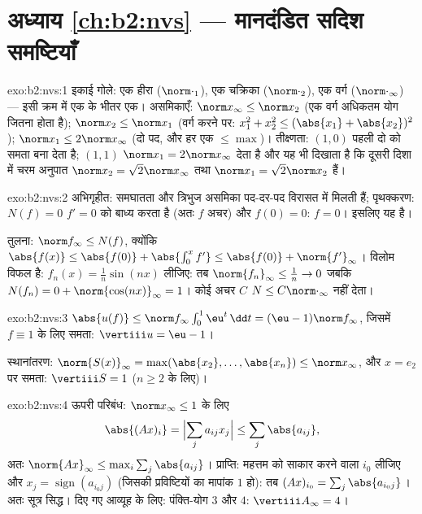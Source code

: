 \section*{अध्याय \ref{ch:b2:nvs} --- मानदंडित सदिश समष्टियाँ}

\begin{solution}{exo:b2:nvs:1}
इकाई गोले: एक हीरा ($\norm\cdot_1$), एक चक्रिका ($\norm\cdot_2$), एक वर्ग ($\norm\cdot_\infty$) --- इसी क्रम
में एक के भीतर एक। असमिकाएँ: $\norm x_\infty \leq \norm x_2$ (एक वर्ग अधिकतम योग जितना होता है);
$\norm x_2 \leq \norm x_1$ (वर्ग करने पर: $x_1^2 + x_2^2 \leq (\abs{x_1}
+ \abs{x_2})^2$); $\norm x_1 \leq 2\norm x_\infty$ (दो पद, और हर एक $\leq \max$)। तीक्ष्णता: $(1, 0)$
पहली दो को समता बना देता है; $(1, 1)$ $\norm x_1 = 2\norm x_\infty$ देता है और यह भी दिखाता है कि
दूसरी दिशा में चरम अनुपात $\norm x_2 = \sqrt2 \norm x_\infty$ तथा $\norm x_1 = \sqrt2 \norm
x_2$ हैं।
\end{solution}

\begin{solution}{exo:b2:nvs:2}
 अभिगृहीत: समघातता और त्रिभुज असमिका पद-दर-पद विरासत में मिलती
हैं; पृथक्करण: $N(f) = 0$ $f' = 0$ को बाध्य करता है (अतः $f$ अचर) और $f(0) = 0$: $f = 0$।
इसलिए यह  है।

तुलना: $\norm f_\infty \leq N(f)$, क्योंकि $\abs{f(x)} \leq
\abs{f(0)} + \abs{\int_0^x f'} \leq \abs{f(0)} +
\norm{f'}_\infty$। विलोम विफल है: $f_n(x) = \frac1n
\sin(nx)$ लीजिए: तब $\norm{f_n}_\infty \leq \frac1n \to 0$ जबकि $N(f_n) = 0 + \norm{\cos(nx)}_\infty = 1$।
कोई अचर $C$ $N \leq C\norm\cdot_\infty$ नहीं देता।
\end{solution}

\begin{solution}{exo:b2:nvs:3}
$\abs{u(f)} \leq \norm f_\infty \int_0^1 \eu^t\,\dd t = (\eu -
1)\norm f_\infty$, जिसमें $f \equiv 1$ के लिए समता: $\vertiii u =
\eu - 1$।

स्थानांतरण: $\norm{S(x)}_\infty = \max(\abs{x_2}, \dots, \abs{x_n}) \leq
\norm x_\infty$, और $x = e_2$ पर समता: $\vertiii S = 1$ ($n
\geq 2$ के लिए)।
\end{solution}

\begin{solution}{exo:b2:nvs:4}
ऊपरी परिबंध: $\norm x_\infty \leq 1$ के लिए
\[
\abs{(Ax)_i} = \Bigl|\sum_j a_{ij}x_j\Bigr| \leq \sum_j
\abs{a_{ij}},
\]
अतः $\norm{Ax}_\infty \leq \max_i \sum_j \abs{a_{ij}}$। प्राप्ति: महत्तम को साकार करने वाला $i_0$ लीजिए और $x_j = \operatorname{sign}(a_{i_0
j})$ (जिसकी
प्रविष्टियों का मापांक $1$ हो): तब $(Ax)_{i_0} = \sum_j \abs{a_{i_0
j}}$। अतः सूत्र सिद्ध। दिए गए आव्यूह
के लिए: पंक्ति-योग $3$ और $4$: $\vertiii A_\infty = 4$।
\end{solution}

